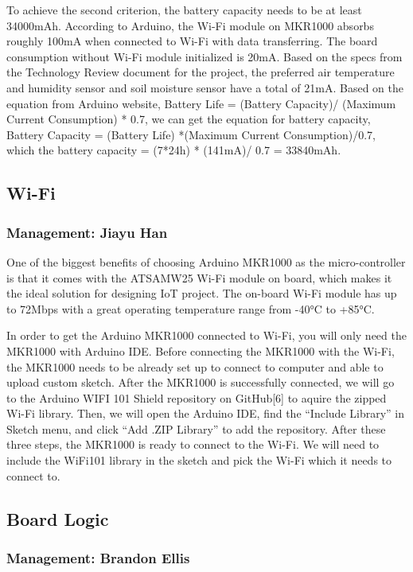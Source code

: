 \documentclass[IEEEtran,letterpaper,10pt,titlepage,fleqn,draftclsnofoot,onecolumn]{article}
\begin{document}
To achieve the second criterion, the battery capacity needs to be at least 34000mAh. According to Arduino, the Wi-Fi module on MKR1000 absorbs roughly 100mA when connected to Wi-Fi with data transferring. The board consumption without Wi-Fi module initialized is 20mA. Based on the specs from the Technology Review document for the project, the preferred air temperature and humidity sensor and soil moisture sensor have a total of 21mA. Based on the equation from Arduino website, Battery Life = (Battery Capacity)/ (Maximum Current Consumption) * 0.7, we can get the equation for battery capacity, Battery Capacity = (Battery Life) *(Maximum Current Consumption)/0.7, which the battery capacity = (7*24h) * (141mA)/ 0.7 = 33840mAh.

\subsection{Wi-Fi}
\subsubsection{Management: Jiayu Han}

One of the biggest benefits of choosing Arduino MKR1000 as the micro-controller is that it comes with the ATSAMW25 Wi-Fi module on board, which makes it the ideal solution for designing IoT project. The on-board Wi-Fi module has up to 72Mbps with a great operating temperature range from -40°C to +85°C.

In order to get the Arduino MKR1000 connected to Wi-Fi, you will only need the MKR1000 with Arduino IDE. Before connecting the MKR1000 with the Wi-Fi, the MKR1000 needs to be already set up to connect to computer and able to upload custom sketch. After the MKR1000 is successfully connected, we will go to the Arduino WIFI 101 Shield repository on GitHub[6] to aquire the zipped Wi-Fi library. Then, we will open the Arduino IDE, find the “Include Library” in Sketch menu, and click “Add .ZIP Library” to add the repository. After these three steps, the MKR1000 is ready to connect to the Wi-Fi. We will need to include the WiFi101 library in the sketch and pick the Wi-Fi which it needs to connect to. 

\subsection{Board Logic}
\subsubsection{Management: Brandon Ellis}
\end{document}
